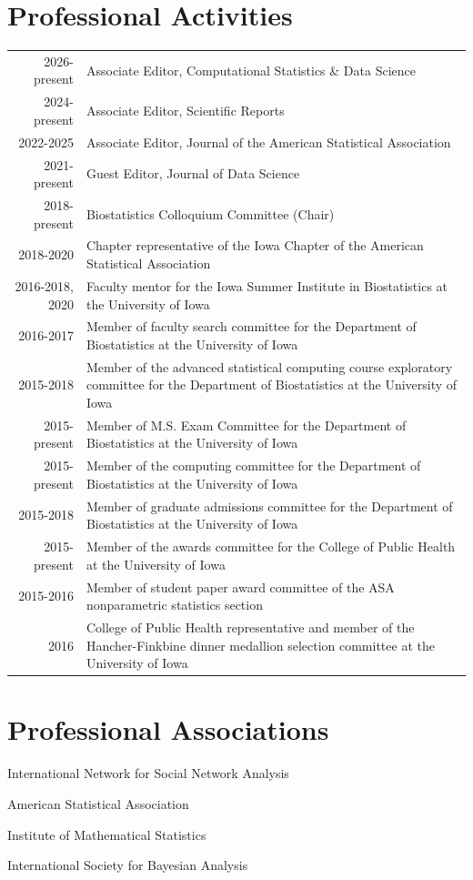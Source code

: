 \documentclass[11pt]{article}
\begin{document}
\section{Professional Activities}
\begin{tabular}{r|p{15cm}}
2026-present & Associate Editor, Computational Statistics \& Data Science \\
2024-present & Associate Editor, Scientific Reports \\
2022-2025 & Associate Editor, Journal of the American Statistical Association \\
2021-present & Guest Editor, Journal of Data Science \\
2018-present & Biostatistics Colloquium Committee (Chair) \\
2018-2020 & Chapter representative of the Iowa Chapter of the American Statistical Association \\
2016-2018, 2020 & Faculty mentor for the Iowa Summer Institute in Biostatistics at the University of Iowa \\
2016-2017 & Member of faculty search committee for the Department of Biostatistics at the University of Iowa \\
2015-2018 & Member of the advanced statistical computing course exploratory committee for the Department of Biostatistics at the University of Iowa \\
2015-present & Member of M.S. Exam Committee for the Department of Biostatistics at the University of Iowa \\
2015-present & Member of the computing committee for the Department of Biostatistics at the University of Iowa \\
2015-2018 & Member of graduate admissions committee for the Department of Biostatistics at the University of Iowa \\
2015-present & Member of the awards committee for the College of Public Health at the University of Iowa \\
2015-2016 & Member of student paper award committee of the ASA nonparametric statistics section \\
2016 & College of Public Health representative and member of the Hancher-Finkbine dinner medallion selection committee at the University of Iowa
\end{tabular}

\vspace{1pc}
\section{Professional Associations}
\begin{description}
\setlength\itemsep{0pc}
\item International Network for Social Network Analysis
\item American Statistical Association
\item Institute of Mathematical Statistics
\item International Society for Bayesian Analysis
\end{description}
\end{document}
